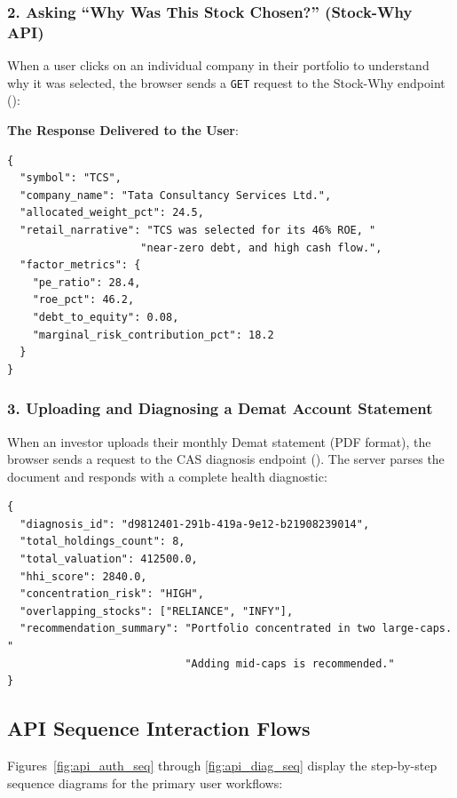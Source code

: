 \subsubsection{2. Asking ``Why Was This Stock Chosen?'' (Stock-Why API)}
When a user clicks on an individual company in their portfolio to understand why it was selected, the browser sends a \texttt{GET} request to the Stock-Why endpoint ():

\noindent \textbf{The Response Delivered to the User}:
\begin{footnotesize}
\begin{verbatim}
{
  "symbol": "TCS",
  "company_name": "Tata Consultancy Services Ltd.",
  "allocated_weight_pct": 24.5,
  "retail_narrative": "TCS was selected for its 46% ROE, "
                     "near-zero debt, and high cash flow.",
  "factor_metrics": {
    "pe_ratio": 28.4,
    "roe_pct": 46.2,
    "debt_to_equity": 0.08,
    "marginal_risk_contribution_pct": 18.2
  }
}
\end{verbatim}
\end{footnotesize}

\subsubsection{3. Uploading and Diagnosing a Demat Account Statement}
When an investor uploads their monthly Demat statement (PDF format), the browser sends a  request to the CAS diagnosis endpoint (). The server parses the document and responds with a complete health diagnostic:
\begin{footnotesize}
\begin{verbatim}
{
  "diagnosis_id": "d9812401-291b-419a-9e12-b21908239014",
  "total_holdings_count": 8,
  "total_valuation": 412500.0,
  "hhi_score": 2840.0,
  "concentration_risk": "HIGH",
  "overlapping_stocks": ["RELIANCE", "INFY"],
  "recommendation_summary": "Portfolio concentrated in two large-caps. "
                            "Adding mid-caps is recommended."
}
\end{verbatim}
\end{footnotesize}

\subsection{API Sequence Interaction Flows}
Figures~\ref{fig:api_auth_seq} through \ref{fig:api_diag_seq} display the step-by-step sequence diagrams for the primary user workflows:


